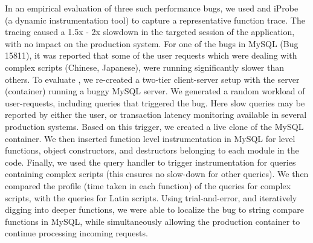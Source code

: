In an empirical evaluation of three such performance bugs, we used \parikshan and iProbe~\cite{iProbe} (a dynamic instrumentation tool) to capture a representative function trace.
The tracing caused a 1.5x - 2x slowdown in the targeted session of the application,  with no impact on the production system.
For one of the bugs in  MySQL (Bug 15811), it was reported that some of the user requests which were dealing with complex scripts (Chinese, Japanese), were running significantly slower than others.
To evaluate \parikshan, we re-created a two-tier client-server setup with the server (container) running a buggy MySQL server. 
We generated a random workload of user-requests, including queries that triggered the bug.
Here slow queries may be reported by either the user, or transaction latency monitoring available in several production systems. 
Based on this trigger, we created a live clone of the MySQL container. 
We then inserted function level instrumentation in MySQL for level functions, object constructors, and destructors belonging to each module in the code.
Finally, we used the query handler to trigger instrumentation for queries containing complex scripts (this ensures no slow-down for other queries).
We then compared the profile (time taken in each function) of the queries for complex scripts, with the queries for Latin scripts.
Using trial-and-error, and iteratively digging into deeper functions, we were able to localize the bug to string compare functions in MySQL, while simultaneously allowing the production container to continue processing incoming requests.


